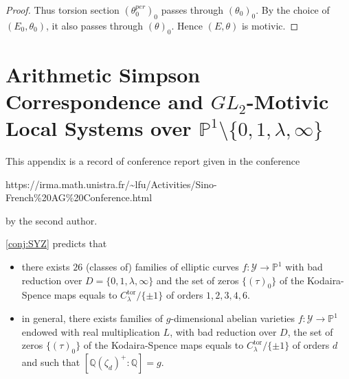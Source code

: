 \documentclass[12pt,twoside]{book}
\theoremstyle{plain}
\theoremstyle{definition}
\theoremstyle{remark}
\numberwithin{equation}{section}
\begin{document}
\begin{proof}
Thus torsion section $(\theta^{per}_0)_0$ passes through $(\theta_0)_0$. By the choice of $(E_0,\theta_0)$, it also passes through $(\theta)_0$. Hence $(E,\theta)$ is motivic.
\end{proof}



\appendix
\section{Arithmetic Simpson Correspondence and $GL_2$-Motivic Local Systems over $\mathbb P^1\setminus\{0,1,\lambda,\infty\}$}

This appendix is a record of conference report given in the conference\\
\begin{center}
{\tiny \blue https://irma.math.unistra.fr/\~{}lfu/Activities/Sino-French\%20AG\%20Conference.html}
\end{center}
by the second author.



\autoref{conj:SYZ} predicts that 

\begin{itemize}
		\item there exists $26$ (classes of) families of elliptic curves $f:\mathcal Y \rightarrow \mathbb P^1$ with bad reduction over $D=\{0,1,\lambda,\infty\}$ and the set of zeros $\{(\tau)_0\}$ of the Kodaira-Spence maps equals  to $C_\lambda^{\mathrm{tor}}/\{\pm1\}$ of orders $1,2,3,4,6$. 
		\item in general, there exists families of $g$-dimensional abelian varieties $f:\mathcal Y \rightarrow \mathbb P^1$ endowed with real multiplication $L$, with bad reduction over $D$,  the set of zeros $\{(\tau)_0\}$ of the Kodaira-Spence maps equals to $C_\lambda^{\mathrm{tor}}/\{\pm1\}$ of orders $d$ and such that $[\mathbb Q(\zeta_d)^+:\mathbb Q]=g$. 
	\end{itemize}  


\newlength\savedwidth
\newcommand\whline{\noalign{\global\savedwidth\arrayrulewidth
		\global\arrayrulewidth 3pt}
	\hline
	\noalign{\global\arrayrulewidth\savedwidth}}
\newlength\savewidth
\newcommand\shline{\noalign{\global\savewidth\arrayrulewidth
		\global\arrayrulewidth 1.5pt}
	\hline
	\noalign{\global\arrayrulewidth\savewidth}}
 
\end{document}
